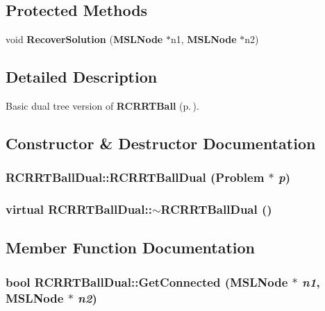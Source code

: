 \subsection*{Protected Methods}
\begin{CompactItemize}
\item 
void {\bf Recover\-Solution} ({\bf MSLNode} $\ast$n1, {\bf MSLNode} $\ast$n2)
\end{CompactItemize}


\subsection{Detailed Description}
Basic dual tree version of {\bf RCRRTBall} {\rm (p.\,\pageref{classRCRRTBall})}.



\subsection{Constructor \& Destructor Documentation}
\subsubsection{\setlength{\rightskip}{0pt plus 5cm}RCRRTBall\-Dual::RCRRTBall\-Dual ({\bf Problem} $\ast$ {\em p})}\label{classRCRRTBallDual_a0}


\subsubsection{\setlength{\rightskip}{0pt plus 5cm}virtual RCRRTBall\-Dual::$\sim$RCRRTBall\-Dual ()\hspace{0.3cm}{\tt  [inline, virtual]}}\label{classRCRRTBallDual_a1}




\subsection{Member Function Documentation}
\subsubsection{\setlength{\rightskip}{0pt plus 5cm}bool RCRRTBall\-Dual::Get\-Connected ({\bf MSLNode} $\ast$ {\em n1}, {\bf MSLNode} $\ast$ {\em n2})\hspace{0.3cm}{\tt  [virtual]}}\label{classRCRRTBallDual_a3}


